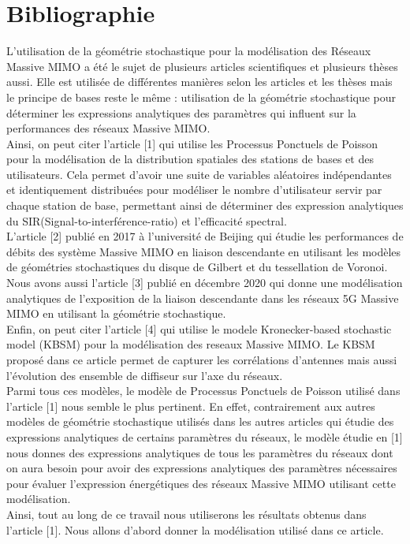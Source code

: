 \documentclass[12pt,onecolumn]{article}
\begin{document}
\section{Bibliographie}
L'utilisation de la géométrie stochastique pour la modélisation des Réseaux Massive MIMO a été le sujet de plusieurs articles scientifiques et plusieurs thèses aussi. Elle est utilisée de différentes manières selon les articles et les thèses mais le principe de bases reste le même : utilisation de la géométrie stochastique pour déterminer les expressions analytiques des paramètres qui influent sur la performances des réseaux Massive MIMO. \\[0.2cm]

Ainsi, on peut citer l'article {\color{blue}{ Massive MIMO Forward Link Analysis for Cellular Network}}[1] qui utilise les Processus Ponctuels de Poisson pour la modélisation de la distribution spatiales des stations de bases et des utilisateurs. Cela permet d'avoir une suite de variables aléatoires indépendantes et identiquement distribuées pour modéliser le nombre d'utilisateur servir par chaque station de base, permettant ainsi de déterminer des expression analytiques du SIR(Signal-to-interférence-ratio) et l'efficacité spectral. \\
L'article {\color{blue}{Rate Analysis of Massive MIMO System Using
Stochastic Geometric Model}}[2] publié en 2017 à l'université de Beijing qui étudie les performances de débits des système Massive MIMO en liaison descendante en utilisant les modèles de géométries stochastiques du disque de Gilbert et du tessellation de Voronoi.\\
Nous avons aussi l'article {\color{blue}{A Statistical Estimation of 5G Massive MIMO Networks’ Exposure Using Stochastic Geometry in mmWave Bands}}[3] publié en décembre 2020 qui donne une modélisation analytiques de l'exposition de la liaison descendante dans les réseaux 5G Massive MIMO en utilisant la géométrie stochastique.\\
Enfin, on peut citer l'article {\color{blue}{A Novel Kronecker-Based Stochastic Model for Massive MIMO Channels}}[4] qui utilise le modele Kronecker-based stochastic model (KBSM) pour la modélisation des reseaux Massive MIMO. Le KBSM proposé dans ce article permet de capturer les corrélations d'antennes mais aussi l'évolution des ensemble de diffiseur sur l'axe du réseaux.\\[0.2cm]

Parmi tous ces modèles, le modèle de Processus Ponctuels de Poisson utilisé dans l'article {\color{blue}{ Massive MIMO Forward Link Analysis for Cellular Network}}[1] nous semble le plus pertinent. En effet, contrairement aux autres modèles de géométrie stochastique utilisés dans les autres articles qui étudie des expressions analytiques de certains paramètres du réseaux, le modèle étudie en [1] nous donnes des expressions analytiques de tous les paramètres du réseaux dont on aura besoin pour avoir des expressions analytiques des paramètres nécessaires pour évaluer l'expression énergétiques des réseaux Massive MIMO utilisant cette modélisation.\\
Ainsi, tout au long de ce travail nous utiliserons les résultats obtenus dans l'article [1]. Nous allons d'abord donner la modélisation utilisé dans ce article.
\end{document}
